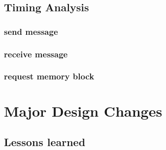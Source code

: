 \documentclass[12pt]{article}
\begin{document}
\subsection{Timing Analysis}
\subsubsection{send message}
\subsubsection{receive message}
\subsubsection{request memory block}
\newpage
\section{Major Design Changes}
\subsection{Lessons learned}
\end{document}
